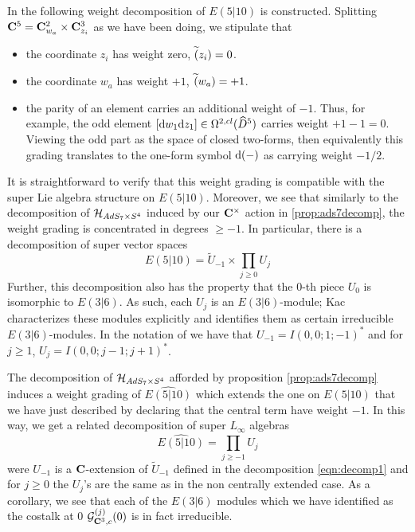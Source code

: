 \documentclass[../main.tex]{subfiles}
\begin{document}
In \cite{KR2} the following weight decomposition of $E(5|10)$ is constructed. Splitting $\mathbf{C}^5 = \mathbf{C}^2_{w_a}\times \mathbf{C}^3_{z_i}$ as we have been doing, we stipulate that
\begin{itemize} 
\item the coordinate $z_i$ has weight zero, $\widetilde(z_i) = 0$. 
\item the coordinate $w_a$ has weight $+1$, $\widetilde(w_a) = +1$. 
\item the parity of an element carries an additional weight of $-1$. 
Thus, for example, the odd element $[\mathrm{d} w_1 \mathrm{d} z_1] \in \Omega^{2,cl}(\widehat{D}^5)$ carries weight $+1 - 1 = 0$. Viewing the odd part as the space of closed two-forms, then equivalently this grading translates to the one-form symbol $\mathrm{d}(-)$ as carrying weight $-1/2$.
\end{itemize} 

It is straightforward to verify that this weight grading is compatible with the super Lie algebra structure on $E(5|10)$. Moreover, we see that similarly to the decomposition of $\mathcal{H}_{AdS_7\times S^4}$ induced by our $\mathbf{C}^\times$ action in \ref{prop:ads7decomp}, the weight grading is concentrated in degrees $\geq -1$.  In particular, there is a decomposition of super vector spaces
\begin{equation}\label{eqn:decomp1}
E(5|10) = \tilde U_{-1} \times \prod_{j \geq 0} U_j 
\end{equation}
Further, this decomposition also has the property that the 0-th piece $U_0$ is isomorphic to $E(3|6)$. As such, each $U_j$ is an $E(3|6)$-module; Kac characterizes these modules explicitly and identifies them as certain irreducible $E(3|6)$-modules. In the notation of \cite{KR2} we have that $U_{-1} = I(0,0;1;-1)^*$ and for $j\geq 1$, $U_j = I(0,0;j-1;j+1)^*$. 

The decomposition of $\mathcal{H}_{AdS_7\times S^4}$ afforded by proposition \ref{prop:ads7decomp} induces a weight grading of $\widehat{E(5|10)}$ which extends the one on $E(5|10)$ that we have just described by declaring that the central term have weight $-1$.
In this way, we get a related decomposition of super $L_\infty$ algebras
\begin{equation}\label{eqn:decomp2}
\widehat{E(5|10)} = \prod_{j \geq -1} U_j            
\end{equation}                      
were $U_{-1}$ is a $\mathbf{C}$-extension of $\tilde U_{-1}$ defined in the decomposition \eqref{eqn:decomp1} and for $j \geq 0$ the $U_j$'s are the same as in the non centrally extended case. As a corollary, we see that each of the $E(3|6)$ modules which we have identified as the costalk at 0 $\mathcal{G}^{(j)}_{\mathbf{C}^3, c} (0)$ is in fact irreducible.
\end{document}
